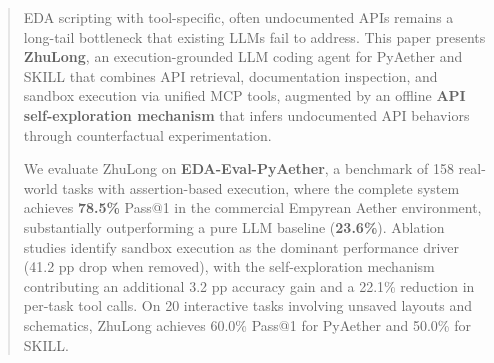 \begin{abstract}
    EDA scripting with tool-specific, often undocumented APIs remains a long-tail 
    bottleneck that existing LLMs fail to address. This paper presents 
    \textbf{ZhuLong}, an execution-grounded LLM coding agent for PyAether and 
    SKILL that combines API retrieval, documentation inspection, and sandbox 
    execution via unified MCP tools, augmented by an offline \textbf{API 
    self-exploration mechanism} that infers undocumented API behaviors through 
    counterfactual experimentation.
    
    We evaluate ZhuLong on \textbf{EDA-Eval-PyAether}, a benchmark of 158
    real-world tasks with assertion-based execution, where the complete system
    achieves \textbf{78.5\%} Pass@1 in the commercial Empyrean Aether
    environment, substantially outperforming a pure LLM baseline (\textbf{23.6\%}). Ablation studies identify sandbox execution as the dominant
    performance driver (41.2 pp drop when removed), with the self-exploration
    mechanism contributing an additional 3.2 pp accuracy gain and a 22.1\%
    reduction in per-task tool calls. On 20 interactive tasks involving unsaved
    layouts and schematics, ZhuLong achieves 60.0\% Pass@1 for PyAether and
    50.0\% for SKILL. 
\end{abstract}

